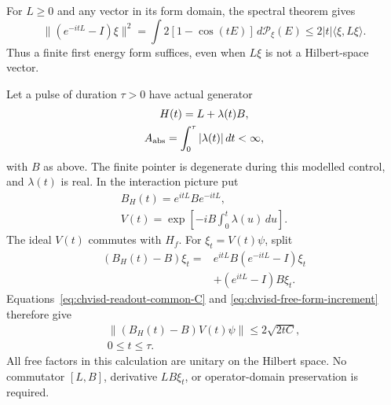 For $L\geq0$ and any vector in its form domain, the spectral theorem gives
\begin{equation}
 \|(e^{-itL}-I)\xi\|^2
   =\int 2[1-\cos(tE)]\,d\mathcal P_\xi(E)
   \leq2|t|\langle\xi,L\xi\rangle.
 \label{eq:chvisd-free-form-increment}
\end{equation}
Thus a finite first energy form suffices, even when $L\xi$ is not a
Hilbert-space vector.

Let a pulse of duration $\tau>0$ have actual generator
\begin{equation}
\begin{gathered}
H(t)=L+\lambda(t)B,\\
 A_{\rm abs}=\int_0^\tau|\lambda(t)|\,dt<\infty,
\end{gathered}
\label{eq:chvisd-readout-driven-generator}
\end{equation}
with $B$ as above. The finite pointer is degenerate during this modelled
control, and $\lambda(t)$ is real. In the interaction picture put
\begin{equation}
\begin{gathered}
B_H(t)=e^{itL}Be^{-itL},\\
 V(t)=\exp\!\left[-iB\int_0^t\lambda(u)\,du\right].
\end{gathered}
\end{equation}
The ideal $V(t)$ commutes with $H_f$. For
$\xi_t=V(t)\psi$, split
\begin{equation}
 \begin{aligned}
 (B_H(t)-B)\xi_t
   ={}&e^{itL}B(e^{-itL}-I)\xi_t\\
      &+(e^{itL}-I)B\xi_t.
 \end{aligned}
\end{equation}
Equations~\eqref{eq:chvisd-readout-common-C} and
\eqref{eq:chvisd-free-form-increment} therefore give
\begin{equation}
\begin{gathered}
\|(B_H(t)-B)V(t)\psi\|
          \leq2\sqrt{2tC},\\
 0\leq t\leq\tau.
\end{gathered}
\label{eq:chvisd-interaction-control-drift}
\end{equation}
All free factors in this calculation are unitary on the Hilbert space.
No commutator $[L,B]$, derivative $LB\xi_t$, or operator-domain
preservation is required.

